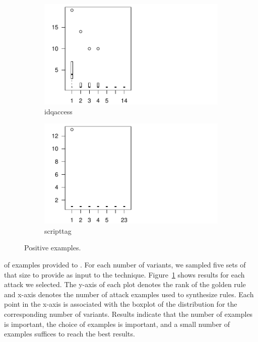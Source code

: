 \documentclass[conference]{IEEEtran}
\begin{document}
\begin{figure}  
  \vspace{-2ex}
  \centering
  \begin{subfigure}{.15\textwidth}
    \centering
    \includegraphics[scale=0.35,trim=10 0 130 0,clip]{R/idqaccess/idqaccess.pdf}
    \vspace{-3ex}
    \caption{idqaccess}
  \end{subfigure}%
  \begin{subfigure}{.15\textwidth}
    \centering
    \includegraphics[scale=0.35,trim=15 0 130 0,clip]{R/scripttag/scripttag.pdf}
    \vspace{-3ex}        
    \caption{scripttag}
  \end{subfigure}%
    \vspace{-1ex}          
  \caption{\label{fig:impact-number-attacks}Positive examples.}
  \vspace{-2ex}
\end{figure}
of examples provided to \tname. For each number of variants, we
sampled five sets of that size to provide as input to the technique.
Figure~\ref{fig:impact-number-attacks} shows results for each
attack we selected. The y-axis of each plot denotes the rank of the
golden rule and x-axis denotes the number of attack examples used to
synthesize rules. Each point in the x-axis is associated with the
boxplot of the distribution for the corresponding number of
variants. Results indicate that the number of examples is important,
the choice of examples is important, and a small number of examples
suffices to reach the best results.
\end{document}
